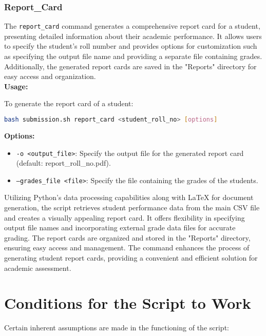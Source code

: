 \documentclass{article}
\begin{document}
\subsubsection{Report\_Card}
The \texttt{report\_card} command generates a comprehensive report card for a student, presenting detailed information about their academic performance. It allows users to specify the student's roll number and provides options for customization such as specifying the output file name and providing a separate file containing grades. Additionally, the generated report cards are saved in the "Reports" directory for easy access and organization.\\
\textbf{Usage:}
\begin{adjustwidth}{0.5cm}{0cm}
To generate the report card of a student:
\begin{lstlisting}[language=bash]
bash submission.sh report_card <student_roll_no> [options]
\end{lstlisting}
\end{adjustwidth}

\textbf{Options:}
\begin{itemize}
    \item \texttt{-o <output\_file>}: Specify the output file for the generated report card (default: report\_{roll\_no}.pdf).
    \item \texttt{--grades\_file <file>}: Specify the file containing the grades of the students.
\end{itemize}

Utilizing Python's data processing capabilities along with LaTeX for document generation, the script retrieves student performance data from the main CSV file and creates a visually appealing report card. It offers flexibility in specifying output file names and incorporating external grade data files for accurate grading. The report cards are organized and stored in the "Reports" directory, ensuring easy access and management. The command enhances the process of generating student report cards, providing a convenient and efficient solution for academic assessment.

\section{Conditions for the Script to Work}

Certain inherent assumptions are made in the functioning of the script:
\end{document}
